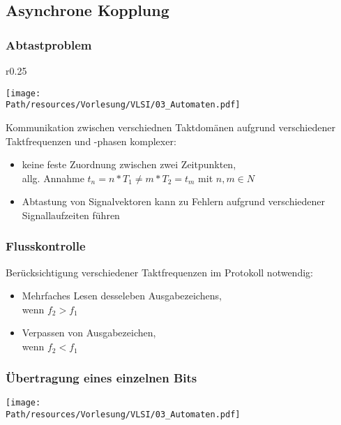 \subsection{Asynchrone Kopplung}

	\subsubsection{Abtastproblem}
	
	\begin{wrapfigure}{r}{0.25\linewidth}
  		\vspace{-20pt}
	  	\begin{center}
			\texttt{[image: \\Path/resources/Vorlesung/VLSI/03\_Automaten.pdf]}
	  	\end{center}
		\vspace{-20pt}
	\end{wrapfigure}
	
	Kommunikation zwischen verschiednen Taktdomänen aufgrund verschiedener Taktfrequenzen und -phasen komplexer:
	\begin{itemize}
		\item keine feste Zuordnung zwischen zwei Zeitpunkten, \\allg. Annahme \( t_n = n * T_1 \neq m* T_2 = t_m\) mit $n,m \in N$
		\item Abtastung von Signalvektoren kann zu Fehlern aufgrund verschiedener Signallaufzeiten führen
	\end{itemize}
	
	\subsubsection{Flusskontrolle}
	Berücksichtigung verschiedener Taktfrequenzen im Protokoll notwendig:
	\begin{itemize}
		\item Mehrfaches Lesen desseleben Ausgabezeichens, \\wenn $f_2 > f_1$
		\item Verpassen von Ausgabezeichen, \\wenn $f_2 < f_1$
	\end{itemize} 
	
	\subsubsection{Übertragung eines einzelnen Bits}
		\begin{center}
			\texttt{[image: \\Path/resources/Vorlesung/VLSI/03\_Automaten.pdf]}
		\end{center}
	
